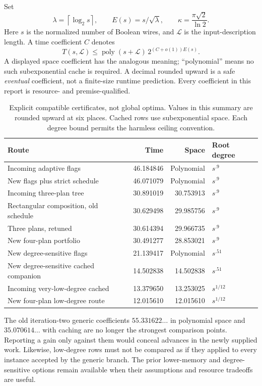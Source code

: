 \documentclass[11pt,letterpaper]{article}
\theoremstyle{remark}\newtheorem{remark}[theorem]{Remark}
\newcommand{\poly}{\operatorname{poly}}\newcommand{\vTwo}{v_2}\newcommand{\ceil}[1]{\left\lceil#1\right\rceil}\newcommand{\floor}[1]{\left\lfloor#1\right\rfloor}\newcommand{\LL}{\mathcal L}
\begin{document}
Set
\begin{equation}\label{eq:scale}
 \lambda=\ceil{\log_2s},\qquad E(s)=s/\sqrt\lambda,\qquad
 \kappa=\frac{\pi\sqrt2}{\ln2}.
\end{equation}
Here $s$ is the normalized number of Boolean wires, and $\LL$ is the input-description length. A time coefficient $C$ denotes
\[
 T(s,\LL)\le\poly(s+\LL)\,2^{(C+o(1))E(s)}.
\]
A displayed space coefficient has the analogous meaning; ``polynomial'' means no such subexponential cache is required. A decimal rounded upward is a safe \emph{eventual} coefficient, not a finite-size runtime prediction. Every coefficient in this report is resource- and premise-qualified.

\begin{table}[htbp]\centering\small
\begin{tabular}{@{}p{}rrl@{}}\toprule
Route & Time & Space & Root degree\\\midrule
Incoming adaptive flags &46.184846&Polynomial&$s^{.9}$\\
New flags plus strict schedule &46.071079&Polynomial&$s^{.9}$\\
Incoming three-plan tree &30.891019&30.753913&$s^{.9}$\\
Rectangular composition, old schedule &30.629498&29.985756&$s^{.9}$\\
Three plans, retuned &30.614394&29.966735&$s^{.9}$\\
New four-plan portfolio &30.491277&28.853021&$s^{.9}$\\
New degree-sensitive flags &21.139417&Polynomial&$s^{.51}$\\
New degree-sensitive cached companion &14.502838&14.502838&$s^{.51}$\\
Incoming very-low-degree cached &13.379650&13.253025&$s^{1/12}$\\
New four-plan low-degree route &12.015610&12.015610&$s^{1/12}$\\\bottomrule
\end{tabular}
\caption{Explicit compatible certificates, not global optima. Values in this summary are rounded upward at six places. Cached rows use subexponential space. Each degree bound permits the harmless ceiling convention.}
\label{tab:main}
\end{table}

The old iteration-two generic coefficients $55.331622\ldots$ in polynomial space and $35.070614\ldots$ with caching are no longer the strongest comparison points. Reporting a gain only against them would conceal advances in the newly supplied work. Likewise, low-degree rows must not be compared as if they applied to every instance accepted by the generic branch. The prior lower-memory and degree-sensitive options remain available when their assumptions and resource tradeoffs are useful.
\end{document}
